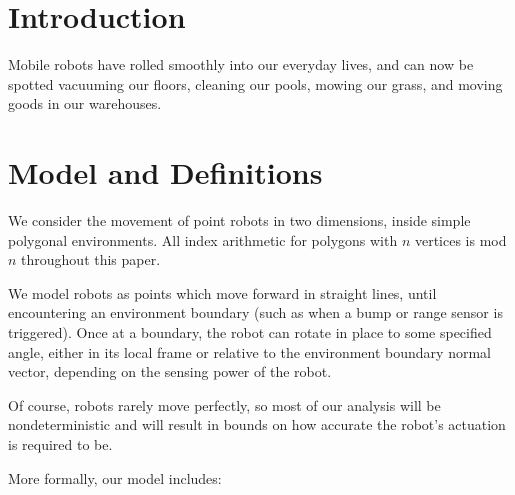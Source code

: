 \documentclass[]{styles/svproc}  %
\begin{document}
\section{Introduction}

Mobile robots have rolled smoothly into our everyday lives, and can now be
spotted vacuuming our floors, cleaning our pools, mowing our grass, and moving
goods in our warehouses. 


\section{Model and Definitions}

We consider the movement of point robots in two dimensions, inside simple polygonal
environments. All index arithmetic for polygons with $n$ vertices is mod $n$ 
throughout this paper.

We model robots as points which move forward in straight lines, until encountering 
an environment boundary (such as when a bump or range
sensor is triggered). Once at a boundary, the robot can rotate in place to some
specified angle, either in its local frame or relative to the environment
boundary normal vector, depending on the sensing power of the robot.

Of course, robots rarely move perfectly, so most of our analysis will be
nondeterministic and will result in bounds on how accurate the robot's actuation
is required to be.

More formally, our model includes:
\end{document}
